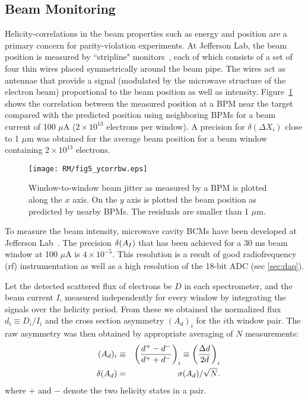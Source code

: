 \subsection{Beam Monitoring}
\label{sec:beam_mon}

Helicity-correlations in the beam properties such as energy and position are
a primary concern for parity-violation experiments.  
At Jefferson Lab, the beam position is measured by ``stripline"
monitors~\cite{stripline}, each of which consists of a set of four thin wires
placed symmetrically around the beam pipe. The wires act as antennae
that provide a signal (modulated by the microwave structure of the
electron beam) proportional to the beam position as well as
intensity. Figure~\ref{fig5:jlabcorr} shows the correlation between
the measured position at a BPM near the target compared with the
predicted position using neighboring BPMs for a beam current of
100 $\mu$A ($2\times 10^{13}$ electrons per window). A precision
for $\delta(\Delta X_i)$ close to 1 $\mu$m was obtained for the
average beam position for a beam window containing $2\times
10^{13}$ electrons.

\begin{figure}[tb]
\begin{center}
\texttt{[image: RM/fig5\_ycorrbw.eps]}
\caption{Window-to-window beam jitter as measured
by a BPM is 
plotted along the $x$ axis. On the $y$ axis is plotted the beam
position as predicted by nearby BPMs. The residuals are smaller
than 1 $\mu$m.}
\label{fig5:jlabcorr}
\end{center}
\end{figure}

To measure the beam intensity, microwave cavity BCMs have been
developed at Jefferson Lab~\cite{A-NIM}. 
The precision $\delta(A_I)$ that has
been achieved for a 30 ms beam window at 100 $\mu$A is $4\times
10^{-5}$. This resolution is a 
result of good radiofrequency (rf)
instrumentation as well as a high resolution of the 18-bit ADC
(sec \ref{sec:daq}).

Let the detected scattered flux of electrons be $D$ in each spectrometer,
and the beam current $I$,
measured independently for every window
by integrating the signals over the helicity period.  From these 
we obtained the normalized flux $d_i \equiv D_i/I_i$ and 
the cross section asymmetry $(A_d)_i$ for the
$i$th window pair. The raw asymmetry was then obtained by
appropriate averaging of $N$ measurements:
%
\begin{eqnarray} \label{eq:asyraw}
(A_d)_i & \equiv &
{\left(\frac{d^+-d^-}
{d^++d^-}\right)}_i 
\equiv {\left(\frac{\Delta d}
{2d}\right)}_i 
\nonumber \\
\quad \delta(A_d) & = &
\sigma(A_d)/\sqrt{N}. \label{eqn:pulsepair}
\end{eqnarray}
%
where $+$ and $-$ denote the two helicity states in a pair.

